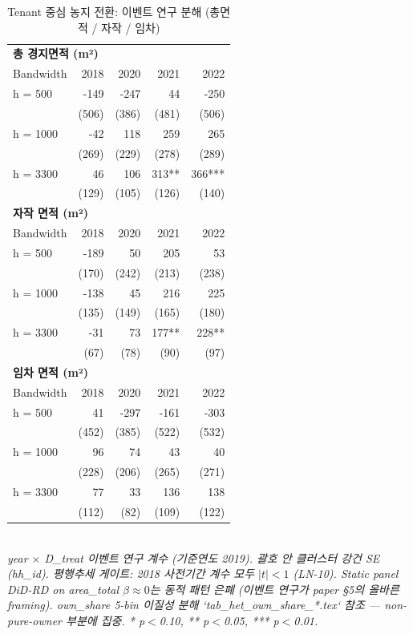 \begin{table}[t]
\centering
\caption{Tenant 중심 농지 전환: 이벤트 연구 분해 (총면적 / 자작 / 임차)}
\label{tab:stabilization_ko}
\begin{tabular}{lrrrr}
\toprule
\multicolumn{5}{l}{\textbf{총 경지면적 (m²)}} \\
Bandwidth & 2018 & 2020 & 2021 & 2022 \\
\midrule
h = 500 & -149 & -247 & 44 & -250 \\
    & (506) & (386) & (481) & (506) \\
h = 1000 & -42 & 118 & 259 & 265 \\
    & (269) & (229) & (278) & (289) \\
h = 3300 & 46 & 106 & 313** & 366*** \\
    & (129) & (105) & (126) & (140) \\
\midrule
\multicolumn{5}{l}{\textbf{자작 면적 (m²)}} \\
Bandwidth & 2018 & 2020 & 2021 & 2022 \\
\midrule
h = 500 & -189 & 50 & 205 & 53 \\
    & (170) & (242) & (213) & (238) \\
h = 1000 & -138 & 45 & 216 & 225 \\
    & (135) & (149) & (165) & (180) \\
h = 3300 & -31 & 73 & 177** & 228** \\
    & (67) & (78) & (90) & (97) \\
\midrule
\multicolumn{5}{l}{\textbf{임차 면적 (m²)}} \\
Bandwidth & 2018 & 2020 & 2021 & 2022 \\
\midrule
h = 500 & 41 & -297 & -161 & -303 \\
    & (452) & (385) & (522) & (532) \\
h = 1000 & 96 & 74 & 43 & 40 \\
    & (228) & (206) & (265) & (271) \\
h = 3300 & 77 & 33 & 136 & 138 \\
    & (112) & (82) & (109) & (122) \\
\midrule
\bottomrule
\end{tabular}
\\
\footnotesize\textit{year $\times$ D\_treat 이벤트 연구 계수 (기준연도 2019). 괄호 안 클러스터 강건 SE (hh\_id). 평행추세 게이트: 2018 사전기간 계수 모두 $|t|<1$ (LN-10). Static panel DiD-RD on area\_total $\beta \approx 0$는 동적 패턴 은폐 (이벤트 연구가 paper \S5의 올바른 framing). own\_share 5-bin 이질성 분해 `tab_het_own_share_*.tex` 참조 — non-pure-owner 부분에 집중. * p$<$0.10, ** p$<$0.05, *** p$<$0.01.}
\end{table}

